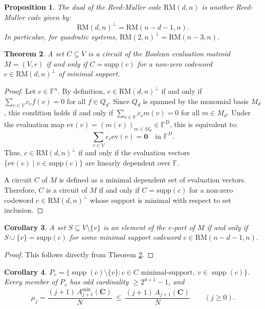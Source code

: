 \documentclass[11pt,a4paper]{article}
\newtheorem{theorem}{Theorem}[section]
\newtheorem{proposition}[theorem]{Proposition}
\newtheorem{corollary}[theorem]{Corollary}
\theoremstyle{definition}
\DeclareMathOperator{\supp}{supp}
\begin{document}
\begin{proposition}
The dual of the Reed-Muller code $\mathrm{RM}(d,n)$ is another Reed-Muller code given by:
\[
\mathrm{RM}(d,n)^\perp = \mathrm{RM}(n - d - 1, n).
\]
In particular, for quadratic systems, $\mathrm{RM}(2,n)^\perp = \mathrm{RM}(n-3, n)$.
\end{proposition}

\begin{theorem}\label{thm:circuits}
A set $C \subseteq V$ is a circuit of the Boolean evaluation matroid $M = (V, r)$ if and only if $C = \mathrm{supp}(c)$ for a non-zero codeword $c \in \mathrm{RM}(d,n)^\perp$ of minimal support.
\end{theorem}

\begin{proof}
Let $c \in \mathbb{F}^n$. By definition, $c \in \mathrm{RM}(d,n)^\perp$ if and only if $\sum_{v \in V} c_v f(v) = 0$ for all $f \in Q_d$. Since $Q_d$ is spanned by the monomial basis $M_d$, this condition holds if and only if $\sum_{v \in V} c_v m(v) = 0$ for all $m \in M_d$. Under the evaluation map $\mathrm{ev}(v) = (m(v))_{m \in M_d} \in \mathbb{F}^D$, this is equivalent to:
\[
\sum_{v \in V} c_v \mathrm{ev}(v) = \mathbf{0} \quad \text{in } \mathbb{F}^D.
\]
Thus, $c \in \mathrm{RM}(d,n)^\perp$ if and only if the evaluation vectors $\{\mathrm{ev}(v) \mid v \in \mathrm{supp}(c)\}$ are linearly dependent over $\mathbb{F}$.

A circuit $C$ of $M$ is defined as a minimal dependent set of evaluation vectors. Therefore, $C$ is a circuit of $M$ if and only if $C = \mathrm{supp}(c)$ for a non-zero codeword $c \in \mathrm{RM}(d,n)^\perp$ whose support is minimal with respect to set inclusion.
\end{proof}

\begin{corollary}\label{cor:minimal-Tv-RM}
A set $S \subseteq V \setminus \{v\}$ is an element of the $v$-port of $M$ if and only if $S \cup \{v\} = \mathrm{supp}(c)$ for some minimal support codeword $c \in \mathrm{RM}(n - d - 1, n)$.
\end{corollary}

\begin{proof}
This follows directly from Theorem \ref{thm:circuits}.
\end{proof}

\begin{corollary}\label{cor:port-rm}
$P_v=\{\supp(c)\setminus\{v\}: c\in C\text{ minimal-support},\ v\in\supp(c)\}$. Every member of $P_v$ has odd cardinality $\ge2^{d+1}-1$, and
\[
\mu_j=\frac{(j+1)\,A^{\min}_{j+1}(\mathbf{C})}{N}\ \le\ \frac{(j+1)\,A_{j+1}(\mathbf{C})}{N}\qquad(j\ge0).
\]
\end{corollary}
\end{document}
